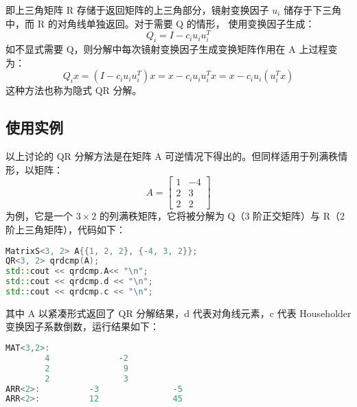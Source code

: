 即上三角矩阵 R 存储于返回矩阵的上三角部分，镜射变换因子 $u_i$ 储存于下三角中，而 R 的对角线单独返回。对于需要 Q 的情形，
使用变换因子生成：
\begin{equation*}
    Q_i=I-c_iu_i u_i^{T}
\end{equation*}
如不显式需要 Q，则分解中每次镜射变换因子生成变换矩阵作用在 A 上过程变为：
\begin{equation*}
    Q_{i}x=(I-c_iu_{i}u_{i}^{T})x=x-c_iu_{i}u_{i}^Tx=x-c_iu_{i}(u_{i}^Tx)
\end{equation*}
这种方法也称为隐式 QR 分解。

\subsection{使用实例}
以上讨论的 QR 分解方法是在矩阵 A 可逆情况下得出的。但同样适用于列满秩情形，以矩阵：
\begin{equation*}
    A=\begin{bmatrix}
        1 & -4 \\
        2 & 3  \\
        2 & 2
    \end{bmatrix}
\end{equation*}
为例，它是一个 $3\times 2$ 的列满秩矩阵，它将被分解为 Q（3 阶正交矩阵）与 R（2阶上三角矩阵），代码如下：
\begin{tcolorbox}
    \begin{center}
        \begin{minipage}{.92\linewidth}
            \begin{lstlisting}[language=C++]
MatrixS<3, 2> A{{1, 2, 2}, {-4, 3, 2}};
QR<3, 2> qrdcmp(A);
std::cout << qrdcmp.A<< "\n";
std::cout << qrdcmp.d << "\n";
std::cout << qrdcmp.c << "\n";
\end{lstlisting}
        \end{minipage}
    \end{center}
\end{tcolorbox}
其中 A 以紧凑形式返回了 QR 分解结果，d 代表对角线元素，c 代表 Householder 变换因子系数倒数，运行结果如下：
\begin{tcolorbox}
    \begin{center}
        \begin{minipage}{.92\linewidth}
            \begin{lstlisting}[language=C++]
MAT<3,2>:
        4              -2
        2               9
        2               3
ARR<2>:          -3               -5
ARR<2>:          12               45
\end{lstlisting}
        \end{minipage}
    \end{center}
\end{tcolorbox}
